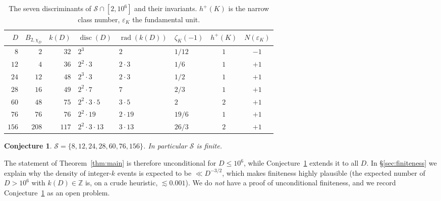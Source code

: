 \documentclass[11pt,reqno]{amsart}
\theoremstyle{plain}
\newtheorem{conjecture}[theorem]{Conjecture}
\theoremstyle{definition}
\DeclareMathOperator{\disc}{disc}
\DeclareMathOperator{\rad}{rad}
\newcommand{\Z}{\mathbb{Z}}
\begin{document}
\begin{table}[h]
\centering
\caption{The seven discriminants of $\mathcal{S}\cap[2,10^{6}]$ and
their invariants.  $h^{+}(K)$ is the narrow class number, $\varepsilon_{K}$ the
fundamental unit.}\label{tab:seven}
\begin{tabular}{rrrlllcc}
\toprule
$D$  & $B_{2,\chi_{D}}$ & $k(D)$ & $\disc(D)$ & $\rad(k(D))$ &
$\zeta_{K}(-1)$ & $h^{+}(K)$ & $N(\varepsilon_{K})$ \\
\midrule
$8$  & $2$   & $32$  & $2^{3}$            & $2$              & $1/12$ & $1$ & $-1$ \\
$12$ & $4$   & $36$  & $2^{2}\!\cdot\! 3$ & $2\!\cdot\! 3$   & $1/6$  & $1$ & $+1$ \\
$24$ & $12$  & $48$  & $2^{3}\!\cdot\! 3$ & $2\!\cdot\! 3$   & $1/2$  & $1$ & $+1$ \\
$28$ & $16$  & $49$  & $2^{2}\!\cdot\! 7$ & $7$              & $2/3$  & $1$ & $+1$ \\
$60$ & $48$  & $75$  & $2^{2}\!\cdot\! 3\!\cdot\! 5$ & $3\!\cdot\! 5$
                                                                & $2$ & $2$ & $+1$ \\
$76$ & $76$  & $76$  & $2^{2}\!\cdot\! 19$  & $2\!\cdot\! 19$ & $19/6$ & $1$ & $+1$ \\
$156$ & $208$ & $117$ & $2^{2}\!\cdot\! 3\!\cdot\! 13$ & $3\!\cdot\! 13$
                                                                & $26/3$ & $2$ & $+1$ \\
\bottomrule
\end{tabular}
\end{table}

\begin{conjecture}\label{conj:complete}
$\mathcal{S}=\{8,12,24,28,60,76,156\}$.  In particular $\mathcal{S}$ is finite.
\end{conjecture}

The statement of Theorem~\ref{thm:main} is therefore unconditional for
$D\le 10^{6}$, while Conjecture~\ref{conj:complete} extends it to all
$D$.  In \S\ref{sec:finiteness} we explain why the density of
integer-$k$ events is expected to be $\ll D^{-3/2}$, which makes
finiteness highly plausible (the expected number of $D>10^{6}$ with
$k(D)\in\Z$ is, on a crude heuristic, $\lesssim 0.001$).  We do
\emph{not} have a proof of unconditional finiteness, and we record
Conjecture~\ref{conj:complete} as an open problem.
\end{document}
